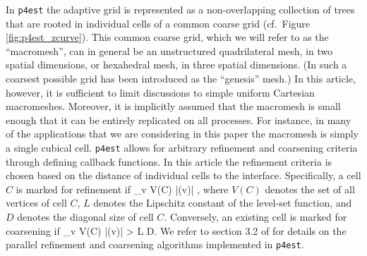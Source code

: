 In \texttt{p4est} the adaptive grid is represented as a non-overlapping collection of trees that are rooted in individual cells of a common coarse grid (cf.\ Figure \ref{fig:p4est_zcurve}).
This common coarse grid, which we will refer to as the ``macromesh'', can in
general be an unstructured quadrilateral mesh, in two spatial dimensions, or
hexahedral mesh, in three spatial dimensions.
(In \cite{StewartEdwards04} such a coarsest possible grid has been introduced
as the ``genesis'' mesh.)
%
In this article, however, it is sufficient to limit discussions to simple
uniform Cartesian macromeshes.
Moreover, it is implicitly assumed that the macromesh is small enough that it
can be entirely replicated on all processes.
For instance, in many of the applications that we are considering in this paper the macromesh is simply a single cubical cell.
\texttt{p4est} allows for arbitrary refinement and coarsening criteria through defining callback functions.
In this article the refinement criteria is chosen based on the distance of individual cells to the interface.
Specifically, a cell $C$ is marked for refinement if
\be
\min_{v \in V(C)} |\phi (v)| \le {},
\label{eq:refine}
\ee
where $V(C)$ denotes the set of all vertices of cell $C$, $L$ denotes the
Lipschitz constant of the level-set function, and $D$ denotes the diagonal size
of cell $C$.
Conversely, an existing cell is marked for coarsening if
\be
\min_{v \in V(C)} |\phi (v)| > L D.
\label{eq:coarsen}
\ee
We refer to section 3.2 of
\cite{Burstedde;Wilcox;Ghattas:11:p4est:-Scalable-Algo} for details on the
parallel refinement and coarsening algorithms implemented in \texttt{p4est}.

